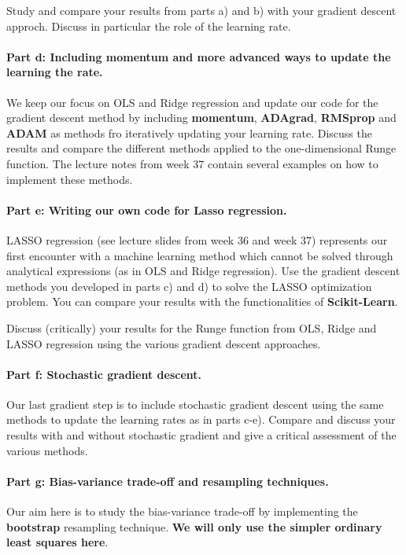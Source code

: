 \documentclass[%
oneside,                 %
final,                   %
10pt]{article}
\begin{document}
Study and compare your results from parts a) and b) with your gradient
descent approch. Discuss in particular the role of the learning rate.

\paragraph{Part d: Including momentum and more advanced ways to update the learning the rate.}
We keep our focus on OLS and Ridge regression and update our code for
the gradient descent method by including \textbf{momentum}, \textbf{ADAgrad},
\textbf{RMSprop} and \textbf{ADAM} as methods fro iteratively updating your learning
rate. Discuss the results and compare the different methods applied to
the one-dimensional Runge function. The lecture notes from week 37 contain several examples on how to implement these methods.

\paragraph{Part e: Writing our own code for Lasso regression.}
LASSO regression (see lecture slides from week 36 and week 37)
represents our first encounter with a machine learning method which
cannot be solved through analytical expressions (as in OLS and Ridge regression). Use the gradient
descent methods you developed in parts c) and d) to solve the LASSO
optimization problem. You can compare your results with 
the functionalities of \textbf{Scikit-Learn}.

Discuss (critically) your results for the Runge function from OLS,
Ridge and LASSO regression using the various gradient descent
approaches.

\paragraph{Part f: Stochastic gradient descent.}
Our last gradient step is to include stochastic gradient descent using
the same methods to update the learning rates as in parts c-e).
Compare and discuss your results with and without stochastic gradient
and give a critical assessment of the various methods.

\paragraph{Part g: Bias-variance trade-off and resampling techniques.}
Our aim here is to study the bias-variance trade-off by implementing
the \textbf{bootstrap} resampling technique.  \textbf{We will only use the simpler
ordinary least squares here}.
\end{document}

